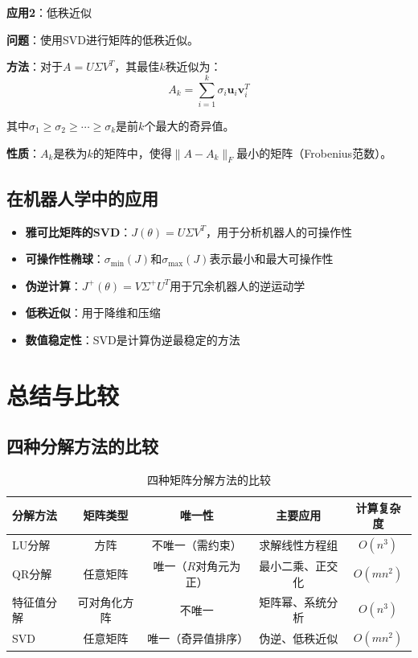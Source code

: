 \documentclass[12pt,a4paper]{article}
\begin{document}
\textbf{应用2}：低秩近似

\textbf{问题}：使用SVD进行矩阵的低秩近似。

\textbf{方法}：对于$A = U\Sigma V^T$，其最佳$k$秩近似为：
\begin{equation}
A_k = \sum_{i=1}^k \sigma_i \bm{u}_i \bm{v}_i^T
\end{equation}

其中$\sigma_1 \geq \sigma_2 \geq \cdots \geq \sigma_k$是前$k$个最大的奇异值。

\textbf{性质}：$A_k$是秩为$k$的矩阵中，使得$\|A - A_k\|_F$最小的矩阵（Frobenius范数）。

\subsection{在机器人学中的应用}

\begin{itemize}
\item \textbf{雅可比矩阵的SVD}：$J(\theta) = U\Sigma V^T$，用于分析机器人的可操作性
\item \textbf{可操作性椭球}：$\sigma_{\min}(J)$和$\sigma_{\max}(J)$表示最小和最大可操作性
\item \textbf{伪逆计算}：$J^+(\theta) = V\Sigma^+ U^T$用于冗余机器人的逆运动学
\item \textbf{低秩近似}：用于降维和压缩
\item \textbf{数值稳定性}：SVD是计算伪逆最稳定的方法
\end{itemize}

\section{总结与比较}

\subsection{四种分解方法的比较}

\begin{table}[h]
\centering
\begin{tabular}{lcccc}
\toprule
\textbf{分解方法} & \textbf{矩阵类型} & \textbf{唯一性} & \textbf{主要应用} & \textbf{计算复杂度} \\
\midrule
LU分解 & 方阵 & 不唯一（需约束） & 求解线性方程组 & $O(n^3)$ \\
QR分解 & 任意矩阵 & 唯一（$R$对角元为正） & 最小二乘、正交化 & $O(mn^2)$ \\
特征值分解 & 可对角化方阵 & 不唯一 & 矩阵幂、系统分析 & $O(n^3)$ \\
SVD & 任意矩阵 & 唯一（奇异值排序） & 伪逆、低秩近似 & $O(mn^2)$ \\
\bottomrule
\end{tabular}
\caption{四种矩阵分解方法的比较}
\end{table}
\end{document}
